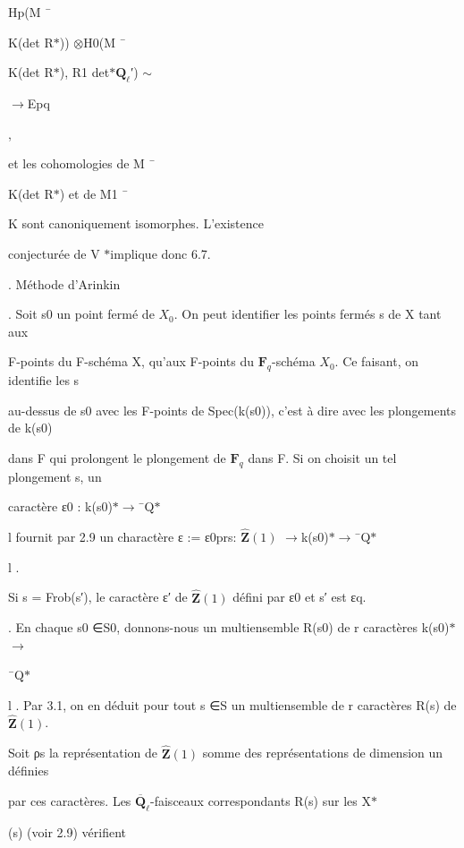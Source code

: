 \documentclass[11pt]{article}
\begin{document}
\noindent Hp(M ¯\par
\noindent K(det R\(*\))) \(\otimes\)H0(M ¯\par
\noindent K(det R\(*\)), R1 det\(*\)\(\mathbf Q_{\ell}\)′) \(\sim\)\par
\noindent \(\to\)Epq\par
{} ,\par
\noindent et les cohomologies de M ¯\par
\noindent K(det R\(*\)) et de M1 ¯\par
\noindent K sont canoniquement isomorphes. L’existence\par
\noindent conjecturée de V \(*\)implique donc 6.7.\par
\medskip
{}. Méthode d’Arinkin\par
{}. Soit s0 un point fermé de \(X_0\). On peut identifier les points fermés s de X tant aux\par
\noindent F-points du F-schéma X, qu’aux F-points du \(\mathbf F_q\)-schéma \(X_0\). Ce faisant, on identifie les s\par
\noindent au-dessus de s0 avec les F-points de Spec(k(s0)), c’est à dire avec les plongements de k(s0)\par
\noindent dans F qui prolongent le plongement de \(\mathbf F_q\) dans F. Si on choisit un tel plongement s, un\par
\noindent caractère ε0 : k(s0)\(*\)\(\to\)¯Q\(*\)\par
\noindent l fournit par 2.9 un charactère ε := ε0prs: \(\widehat{\mathbf Z}(1)\) \(\to\)k(s0)\(*\)\(\to\)¯Q\(*\)\par
\noindent l .\par
\noindent Si s = Frob(s′), le caractère ε′ de \(\widehat{\mathbf Z}(1)\) défini par ε0 et s′ est εq.\par
{}. En chaque s0 ∈S0, donnons-nous un multiensemble R(s0) de r caractères k(s0)\(*\)\(\to\)\par
\noindent ¯Q\(*\)\par
\noindent l . Par 3.1, on en déduit pour tout s ∈S un multiensemble de r caractères R(s) de \(\widehat{\mathbf Z}(1)\).\par
\noindent Soit ρs la représentation de \(\widehat{\mathbf Z}(1)\) somme des représentations de dimension un définies\par
\noindent par ces caractères. Les \(\overline{\mathbf Q}_{\ell}\)-faisceaux correspondants R(s) sur les X\(*\)\par
\noindent (s) (voir 2.9) vérifient\par
\end{document}
